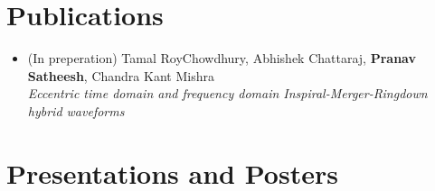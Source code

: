 \documentclass[margin, centered]{res}
\begin{document}
\begin{resume}

\section{Publications}
\begin{itemize}[leftmargin=*]
    \item (In preperation) Tamal RoyChowdhury, Abhishek Chattaraj, \textbf{Pranav Satheesh}, Chandra Kant Mishra\\
    \textit{Eccentric time domain and frequency domain Inspiral-Merger-Ringdown hybrid waveforms}
\end{itemize}



\section{Presentations and Posters}


\end{resume}
\end{document}
